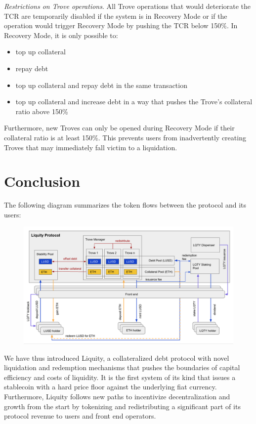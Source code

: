 \documentclass{article}
\begin{document}
\textit{Restrictions on Trove operations}. All Trove operations that would deteriorate the TCR are temporarily disabled if the system is in Recovery Mode or if the operation would trigger Recovery Mode by pushing the TCR below 150\%. In Recovery Mode, it is only possible to:
\begin{itemize}
    \item top up collateral
    \item repay debt
    \item top up collateral and repay debt in the same transaction 
    \item top up collateral and increase debt in a way that pushes the Trove's collateral ratio above 150\%
\end{itemize}

Furthermore, new Troves can only be opened during Recovery Mode if their collateral ratio is at least 150\%. This prevents users from inadvertently creating Troves that may immediately fall victim to a liquidation.

\section{Conclusion}
The following diagram summarizes the token flows between the protocol and its users:\\

\begin{figure}[ht]
\centering
\includegraphics[width=16cm]{a14.png}
\end{figure}

We have thus introduced Liquity, a collateralized debt protocol with novel liquidation and redemption mechanisms that pushes the boundaries of capital efficiency and costs of liquidity. It is the first system of its kind that issues a stablecoin with a hard price floor against the underlying fiat currency. Furthermore, Liquity follows new paths to incentivize decentralization and growth from the start by tokenizing and redistributing a significant part of its protocol revenue to users and front end operators. 
\end{document}
